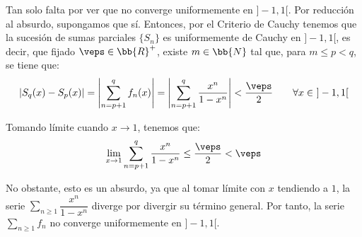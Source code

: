 \begin{ejercicio}
    Tan solo falta por ver que no converge uniformemente en $]-1,1[$. Por reducción al absurdo, supongamos que sí.
    Entonces, por el Criterio de Cauchy tenemos que la sucesión de sumas parciales $\{S_n\}$ es uniformemente de Cauchy en $]-1,1[$, es decir, que fijado
    $\veps\in \bb{R}^+$, existe $m\in \bb{N}$ tal que, para $m\leq p < q$, se tiene que:
    \begin{equation*}
        |S_q(x) - S_p(x)| = \left|\sum_{n=p+1}^q f_n(x)\right|
        = \left|\sum_{n=p+1}^q \frac{x^n}{1-x^n}\right| < \frac{\veps}{2} \qquad \forall x\in~]-1,1[
    \end{equation*}
    
    Tomando límite cuando $x\to 1$, tenemos que:
    \begin{equation*}
        \lim_{x\to 1}\sum_{n=p+1}^q \frac{x^n}{1-x^n} \leq \frac{\veps}{2} < \veps
    \end{equation*}

    No obstante, esto es un absurdo, ya que al tomar límite con $x$ tendiendo a $1$, la serie $\sum\limits_{n\geq 1}\dfrac{x^n}{1-x^n}$ diverge por divergir
    su término general. Por tanto, la serie $\sum\limits_{n\geq 1}f_n$ no converge uniformemente en $]-1,1[$.
\end{ejercicio}


